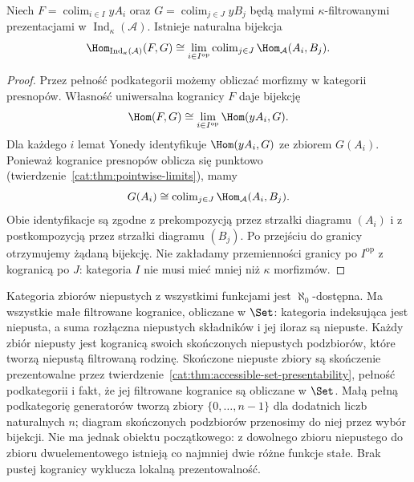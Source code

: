 \begin{wniosek}\label{cat:cor:accessible-ind-hom}
Niech $F=\operatorname{colim}_{i\in I}yA_i$ oraz $G=\operatorname{colim}_{j\in J}yB_j$ będą małymi $\kappa$-filtrowanymi prezentacjami w $\operatorname{Ind}_\kappa(\mathcal A)$. Istnieje naturalna bijekcja
\[
 \Hom_{\operatorname{Ind}_\kappa(\mathcal A)}(F,G)
 \cong
 \lim_{i\in I^{\mathrm{op}}}\operatorname{colim}_{j\in J}
 \Hom_{\mathcal A}(A_i,B_j).
\]
\end{wniosek}
\begin{proof}
Przez pełność podkategorii możemy obliczać morfizmy w kategorii presnopów. Własność uniwersalna kogranicy $F$ daje bijekcję
\[
 \Hom(F,G)\cong\lim_{i\in I^{\mathrm{op}}}\Hom(yA_i,G).
\]
Dla każdego $i$ lemat Yonedy identyfikuje $\Hom(yA_i,G)$ ze zbiorem $G(A_i)$. Ponieważ kogranice presnopów oblicza się punktowo (twierdzenie~\ref{cat:thm:pointwise-limits}), mamy
\[
 G(A_i)\cong\operatorname{colim}_{j\in J}
             \Hom_{\mathcal A}(A_i,B_j).
\]
Obie identyfikacje są zgodne z prekompozycją przez strzałki diagramu $(A_i)$ i z postkompozycją przez strzałki diagramu $(B_j)$. Po przejściu do granicy otrzymujemy żądaną bijekcję. Nie zakładamy przemienności granicy po $I^{\mathrm{op}}$ z kogranicą po $J$: kategoria $I$ nie musi mieć mniej niż $\kappa$ morfizmów.
\end{proof}

\begin{przyklad}\label{cat:ex:accessible-not-local}
Kategoria zbiorów niepustych z wszystkimi funkcjami jest $\aleph_0$-dostępna. Ma wszystkie małe filtrowane kogranice, obliczane w $\Set$: kategoria indeksująca jest niepusta, a suma rozłączna niepustych składników i jej iloraz są niepuste. Każdy zbiór niepusty jest kogranicą swoich skończonych niepustych podzbiorów, które tworzą niepustą filtrowaną rodzinę. Skończone niepuste zbiory są skończenie prezentowalne przez twierdzenie~\ref{cat:thm:accessible-set-presentability}, pełność podkategorii i fakt, że jej filtrowane kogranice są obliczane w $\Set$. Małą pełną podkategorię generatorów tworzą zbiory $\{0,\ldots,n-1\}$ dla dodatnich liczb naturalnych $n$; diagram skończonych podzbiorów przenosimy do niej przez wybór bijekcji. Nie ma jednak obiektu początkowego: z dowolnego zbioru niepustego do zbioru dwuelementowego istnieją co najmniej dwie różne funkcje stałe. Brak pustej kogranicy wyklucza lokalną prezentowalność.
\end{przyklad}

